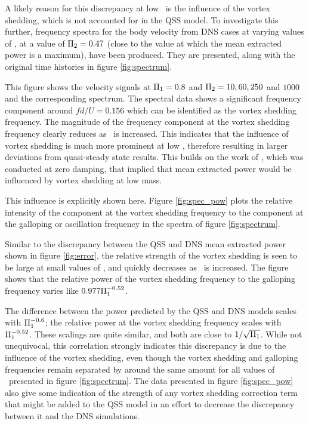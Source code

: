 

A likely reason for this discrepancy at low \massstiff\ is the influence of the vortex shedding, which is not accounted for in the QSS model. To investigate this further, frequency spectra for the body velocity from DNS cases at varying values of \massstiff, at a value of $\Pi_2=0.47$ (close to the value at which the mean extracted power is a maximum), have been produced. They are presented, along with the original time histories in figure \ref{fig:spectrum}.



This figure shows the  velocity signals at $\Pi_1=0.8$ and $\Pi_2= 10, 60, 250$ and $1000$ and the corresponding spectrum. The spectral data shows a significant frequency component around $fd/U=0.156$ which can be identified as the vortex shedding frequency. The magnitude of the frequency component at the vortex shedding frequency clearly reduces as \massstiff\ is increased. This indicates that the influence of vortex shedding is much more prominent at low \massstiff,  therefore resulting in larger deviations from quasi-steady state results. This builds on the work of \cite{Joly2012}, which was conducted at zero damping, that implied that mean extracted power would be influenced by vortex shedding at low mass.

This influence is explicitly shown here. Figure \ref{fig:spec_pow} plots the relative intensity of the component at the vortex shedding frequency to the component at the galloping or oscillation frequency in the spectra of figure \ref{fig:spectrum}.




Similar to the discrepancy between the QSS and DNS mean extracted power shown in figure \ref{fig:error}, the relative strength of the vortex shedding is seen to be large at small values of \massstiff, and quickly decreases as \massstiff\ is increased. The figure shows that the relative power of the vortex shedding frequency to the galloping frequency varies like $0.977\Pi_1^{-0.52}$.

The difference between the power predicted by the QSS and DNS models scales with $\Pi_1^{-0.6}$; the relative power at the vortex shedding frequency scales with $\Pi_1^{-0.52}$. These scalings are quite similar, and both are close to $1/\sqrt{\Pi_1}$. While not unequivocal, this correlation strongly indicates this discrepancy is due to the influence of the vortex shedding, even though the vortex shedding and galloping frequencies remain separated by around the same amount for all values of \massstiff\ presented in figure \ref{fig:spectrum}. The data presented in figure \ref{fig:spec_pow} also give some indication of the strength of any vortex shedding correction term that might be added to the QSS model in an effort to decrease the discrepancy between it and the DNS simulations.

